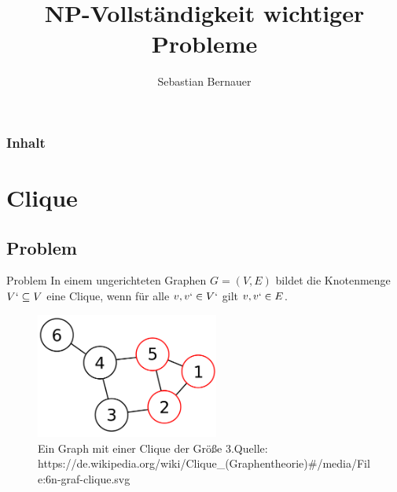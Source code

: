 \documentclass[12pt,donthandout,notes=dontshow,xcolor=table]{beamer}
\author{Sebastian Bernauer}
\title{NP-Vollständigkeit wichtiger Probleme}
\begin{document}
\begin{frame}
\titlepage
\end{frame}

\begin{frame}[allowframebreaks]
\frametitle{Inhalt}
\tableofcontents
\end{frame}

%



\section{Clique}
\subsection{Problem}
\begin{frame}{Problem}
In einem ungerichteten Graphen $G = (V,E)$ bildet die Knotenmenge $V` \subseteq V$ eine Clique, wenn für alle $v, v` \in V`$ gilt ${v,v`} \in E$. \cite{wegener}
\pause
\begin{figure}
\includegraphics[width=6cm]{figures/clique1.png}
\caption{Ein Graph mit einer Clique der Größe 3.\newline \newline \tiny Quelle: https://de.wikipedia.org/wiki/Clique\_(Graphentheorie)\#/media/File:6n-graf-clique.svg}
\end{figure}
\end{frame}
\end{document}

